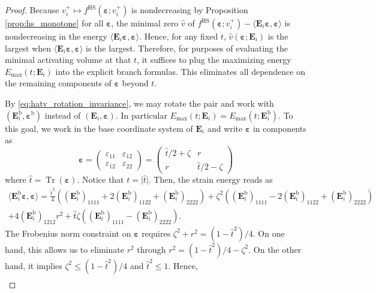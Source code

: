 \documentclass[preprint,3p]{elsarticle}
\newcommand{\tenss}[1]{\bm{\mathbf{#1}}}            %
\newcommand{\tensf}[1]{\bm{\mathbf{#1}}}            %
\newcommand{\strain}{\tenss{\varepsilon}}           %
\newcommand{\Ei}{\tensf{E}_i}                       %
\newcommand{\Tr}{\operatorname{Tr}}
\begin{document}
\begin{proof}
Because $v_i^+ \mapsto f^{\mathrm{HS}}(\strain;v_i^+)$ is nondecreasing by Proposition \ref{prop:hs_monotone} for all $\strain$, the minimal zero $\hat{v}$ of $f^{\mathrm{HS}}(\strain;v_i^+) - \langle \Ei\strain,\strain\rangle$ is nondecreasing in the energy $\langle \Ei\strain,\strain\rangle$. Hence, for any fixed $t$, $\hat{v}(\strain;\Ei)$ is the largest when $\langle \Ei\strain,\strain\rangle$ is the largest. Therefore, for purposes of evaluating the minimal activating volume at that $t$, it suffices to plug the maximizing energy $E_{\max}(t;\Ei)$ into the explicit branch formulas. This eliminates all dependence on the remaining components of $\strain$ beyond $t$.

By \eqref{eq:hatv_rotation_invariance}, we may rotate the pair and work with $(\Ei^{\mathrm{b}},\strain^{\mathrm{b}})$ instead of $(\Ei,\strain)$. In particular $E_{\max}(t;\Ei)=E_{\max}(t;\Ei^{\mathrm{b}})$. To this goal, we work in the base coordinate system of $\Ei$ and write $\strain$ in components as
%
\begin{equation}
\strain = \begin{pmatrix}
    \varepsilon_{11} & \varepsilon_{12}\\
    \varepsilon_{12} & \varepsilon_{22}
\end{pmatrix} = 
\begin{pmatrix}
    \hat{t}/2 + \zeta & r\\
    r & \hat{t}/2 - \zeta
\end{pmatrix}
\end{equation}
%
where $\hat{t} = \Tr(\strain)$. Notice that $t = \lvert \hat{t}\rvert$. Then, the strain energy reads as
%
\begin{multline}
    \langle \Ei^{\mathrm{b}}\strain,\strain\rangle = \frac{\hat{t}^2}{4}\left((\Ei^{\mathrm{b}})_{1111} + 2(\Ei^{\mathrm{b}})_{1122} + (\Ei^{\mathrm{b}})_{2222}\right) + \zeta^2 \left((\Ei^{\mathrm{b}})_{1111} - 2(\Ei^{\mathrm{b}})_{1122} + (\Ei^{\mathrm{b}})_{2222}\right) \\
    + 4(\Ei^{\mathrm{b}})_{1212} r^2 + \hat{t} \zeta ((\Ei^{\mathrm{b}})_{1111} - (\Ei^{\mathrm{b}})_{2222}).
\end{multline}
%
The Frobenius norm constraint on $\strain$ requires $\zeta^2 + r^2 = (1 - \hat{t}^2)/4$. On one hand, this allows us to eliminate $r^2$ through $r^2 = (1 - \hat{t}^2)/4 - \zeta^2$. On the other hand, it implies $\zeta^2 \le (1 - \hat{t}^2)/4$ and $\hat{t}^2 \le 1$. Hence,
%
\begin{multline}\label{eq:opt_emax}

\end{multline}
\end{proof}
\end{document}
